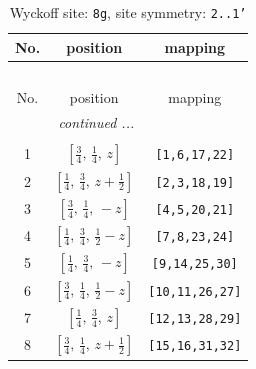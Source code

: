 \documentclass[fleqn,8pt]{jsarticle}
\begin{document}
\begin{longtable}{ccc}
\caption{Wyckoff site: {\tt 8g}, site symmetry: {\tt 2..1'}}
 \\
 \hline \hline
No. & position & mapping \\ \hline \endfirsthead

\multicolumn{2}{l}{\tablename\ \thetable{}} \\
 \hline \hline
No. & position & mapping \\ \hline \endhead

 \hline \hline
\multicolumn{2}{r}{\footnotesize\it continued ...} \\ \endfoot

 \hline \hline
\multicolumn{2}{r}{} \\ \endlastfoot

1 & $\left[ \frac{3}{4},\, \frac{1}{4},\, z \right]$ & {\tt [1,6,17,22]} \\ \hline
2 & $\left[ \frac{1}{4},\, \frac{3}{4},\, z + \frac{1}{2} \right]$ & {\tt [2,3,18,19]} \\ \hline
3 & $\left[ \frac{3}{4},\, \frac{1}{4},\, - z \right]$ & {\tt [4,5,20,21]} \\ \hline
4 & $\left[ \frac{1}{4},\, \frac{3}{4},\, \frac{1}{2} - z \right]$ & {\tt [7,8,23,24]} \\ \hline
5 & $\left[ \frac{1}{4},\, \frac{3}{4},\, - z \right]$ & {\tt [9,14,25,30]} \\ \hline
6 & $\left[ \frac{3}{4},\, \frac{1}{4},\, \frac{1}{2} - z \right]$ & {\tt [10,11,26,27]} \\ \hline
7 & $\left[ \frac{1}{4},\, \frac{3}{4},\, z \right]$ & {\tt [12,13,28,29]} \\ \hline
8 & $\left[ \frac{3}{4},\, \frac{1}{4},\, z + \frac{1}{2} \right]$ & {\tt [15,16,31,32]} \\
\end{longtable}
\renewcommand{\arraystretch}{1.2}
\end{document}
